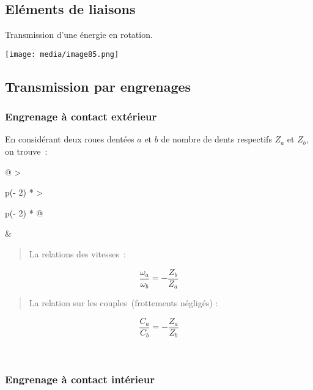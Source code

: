 \documentclass[
]{article}
\begin{document}
\hypertarget{eluxe9ments-de-liaisons}{%
\subsection{Eléments de liaisons}\label{eluxe9ments-de-liaisons}}

Transmission d'une énergie en rotation.

\texttt{[image: media/image85.png]}

\hypertarget{transmission-par-engrenages}{%
\subsection{Transmission par
engrenages}\label{transmission-par-engrenages}}

\hypertarget{engrenage-uxe0-contact-extuxe9rieur}{%
\subsubsection{Engrenage à contact
extérieur}\label{engrenage-uxe0-contact-extuxe9rieur}}

En considérant deux roues dentées \(a\) et \(b\) de nombre de dents
respectifs \(Z_{a}\) et \(Z_{b}\), on trouve~:

\begin{longtable}[]{@{}
  >{\raggedright\arraybackslash}p{(\columnwidth - 2\tabcolsep) * }
  >{\raggedright\arraybackslash}p{(\columnwidth - 2\tabcolsep) * }@{}}
\toprule
\endhead
& \begin{minipage}[t]{\linewidth}\raggedright
\begin{quote}
La relations des vitesses~:
\end{quote}

\[\boxed{\frac{\omega_{a}}{\omega_{b}} = - \frac{Z_{b}}{Z_{a}}}\]

\begin{quote}
La relation sur les couples~\(
\)(frottements négligés) :
\end{quote}

\[\boxed{\frac{C_{a}}{C_{b}} = - \frac{Z_{a}}{Z_{b}}}\]
\end{minipage} \\
\bottomrule
\end{longtable}

\hypertarget{engrenage-uxe0-contact-intuxe9rieur}{%
\subsubsection{Engrenage à contact
intérieur}\label{engrenage-uxe0-contact-intuxe9rieur}}
\end{document}

